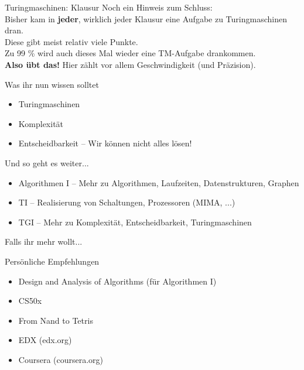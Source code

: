 

\begin{frame}{Turingmaschinen: Klausur}
	Noch ein Hinweis zum Schluss:\\
	Bisher kam in \textbf{jeder}, wirklich jeder Klausur eine Aufgabe zu Turingmaschinen dran.\\
	Diese gibt meist relativ viele Punkte.\\
	
	\bigskip
	Zu 99 \% wird auch dieses Mal wieder eine TM-Aufgabe drankommen.\\
	\textbf{Also übt das!} Hier zählt vor allem Geschwindigkeit (und Präzision).
\end{frame}

\begin{frame}	
	\begin{block}{Was ihr nun wissen solltet}
		\begin{itemize}
			\item Turingmaschinen
			\item Komplexität
			\item Entscheidbarkeit -- Wir können nicht alles lösen!
		\end{itemize}
	\end{block}
	
	\begin{block}{Und so geht es weiter...}
		\begin{itemize}
			\item Algorithmen I -- Mehr zu Algorithmen, Laufzeiten, Datenstrukturen, Graphen
			\item TI -- Realisierung von Schaltungen, Prozessoren (MIMA, ...)
			\item TGI -- Mehr zu Komplexität, Entscheidbarkeit, Turingmaschinen
		\end{itemize}
	\end{block}
\end{frame}

\begin{frame}{Falls ihr mehr wollt...}
	\begin{block}{Persönliche Empfehlungen}
		\begin{itemize}
			\item Design and Analysis of Algorithms (für Algorithmen I)
			\item CS50x
			\item From Nand to Tetris
		\end{itemize}
	\end{block}

	\begin{itemize}
		\item EDX (edx.org)
		\item Coursera (coursera.org)
	\end{itemize}
\end{frame}

